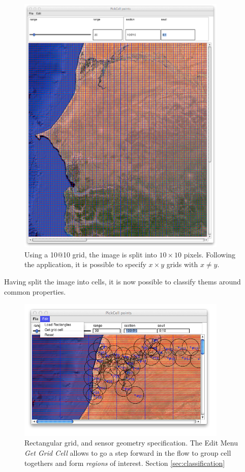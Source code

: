 \begin{figure}[hbtp]
\begin{center} 
\includegraphics[width=10cm]{SenegalGrid10x10.png}
\caption{Using a 10@10 grid, the image is split into $10\times10$ pixels. 
Following the application, it is possible to specify $x  \times   y$ grids with $x  \neq  y$.}
\label{fig:SenegalGrid10x10}
\end{center}
\end{figure}

Having split the image into cells, it is now possible to classify thems around common properties.

\begin{figure}[hbtp]
\begin{center} 
\includegraphics[width=10cm]{SenegalGetGridCell.png}
\caption{Rectangular grid, and sensor geometry specification. The Edit Menu {\sl Get Grid Cell} allows to go a step forward in the flow
to group cell togethers and form {\sl regions} of interest. Section \ref{sec:classification}}
\label{fig:SenegalGetGridCell}
\end{center}
\end{figure}

